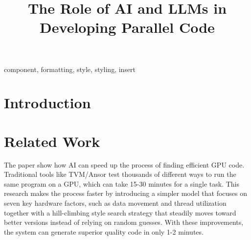 \documentclass[conference]{IEEEtran}
\begin{document}
\title{The Role of AI and LLMs in Developing Parallel Code\\
}

\author{
\and
{}
\and
{}
}

\maketitle

\begin{abstract}

\end{abstract}

\begin{IEEEkeywords}
component, formatting, style, styling, insert
\end{IEEEkeywords}

\section{Introduction}

\section{Related Work}

The paper \cite{10.1145/3650200.3656626} show how AI can speed up the process of finding efficient GPU code. Traditional tools like TVM/Ansor test thousands of different ways to run the same program on a GPU, which can take 15-30 minutes for a single task. This research makes the process faster by introducing a simpler model that focuses on seven key hardware factors, such as data movement and thread utilization together with a hill-climbing style search strategy that steadily moves toward better versions instead of relying on random guesses. With these improvements, the system can generate superior quality code in only 1-2 minutes.
\end{document}
